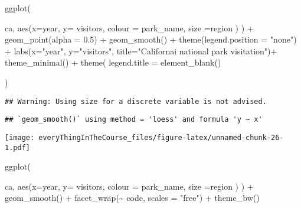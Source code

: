 \documentclass[
]{article}
\newenvironment{Shaded}{\begin{snugshade}}{\end{snugshade}}
\newcommand{\AttributeTok}[1]{\textcolor[rgb]{0.77,0.63,0.00}{#1}}
\newcommand{\FloatTok}[1]{\textcolor[rgb]{0.00,0.00,0.81}{#1}}
\newcommand{\FunctionTok}[1]{\textcolor[rgb]{0.00,0.00,0.00}{#1}}
\newcommand{\NormalTok}[1]{#1}
\newcommand{\SpecialCharTok}[1]{\textcolor[rgb]{0.00,0.00,0.00}{#1}}
\newcommand{\StringTok}[1]{\textcolor[rgb]{0.31,0.60,0.02}{#1}}
\begin{document}
\begin{Shaded}
\begin{Highlighting}[]
\FunctionTok{ggplot}\NormalTok{(}
  
\NormalTok{  ca, }\FunctionTok{aes}\NormalTok{(}\AttributeTok{x=}\NormalTok{year, }\AttributeTok{y=}\NormalTok{ visitors, }\AttributeTok{colour =}\NormalTok{ park\_name, }\AttributeTok{size =}\NormalTok{region )}
\NormalTok{) }\SpecialCharTok{+}
  \FunctionTok{geom\_point}\NormalTok{(}\AttributeTok{alpha =} \FloatTok{0.5}\NormalTok{) }\SpecialCharTok{+}
  \FunctionTok{geom\_smooth}\NormalTok{() }\SpecialCharTok{+}
  \FunctionTok{theme}\NormalTok{(}\AttributeTok{legend.position =} \StringTok{"none"}\NormalTok{) }\SpecialCharTok{+}
  \FunctionTok{labs}\NormalTok{(}\AttributeTok{x=}\StringTok{"year"}\NormalTok{, }\AttributeTok{y=}\StringTok{"visitors"}\NormalTok{, }\AttributeTok{title=}\StringTok{"Californai national park visitation"}\NormalTok{)}\SpecialCharTok{+}
  \FunctionTok{theme\_minimal}\NormalTok{() }\SpecialCharTok{+}
  \FunctionTok{theme}\NormalTok{(}
    \AttributeTok{legend.title =} \FunctionTok{element\_blank}\NormalTok{()}
    
\NormalTok{  )}
\end{Highlighting}
\end{Shaded}

\begin{verbatim}
## Warning: Using size for a discrete variable is not advised.
\end{verbatim}

\begin{verbatim}
## `geom_smooth()` using method = 'loess' and formula 'y ~ x'
\end{verbatim}

\texttt{[image: everyThingInTheCourse\_files/figure-latex/unnamed-chunk-26-1.pdf]}

\begin{Shaded}
\begin{Highlighting}[]
\FunctionTok{ggplot}\NormalTok{(}
  
\NormalTok{  ca, }\FunctionTok{aes}\NormalTok{(}\AttributeTok{x=}\NormalTok{year, }\AttributeTok{y=}\NormalTok{ visitors, }\AttributeTok{colour =}\NormalTok{ park\_name, }\AttributeTok{size =}\NormalTok{region )}
\NormalTok{) }\SpecialCharTok{+}
  \FunctionTok{geom\_smooth}\NormalTok{() }\SpecialCharTok{+}
  \FunctionTok{facet\_wrap}\NormalTok{(}\SpecialCharTok{\textasciitilde{}}\NormalTok{ code, }\AttributeTok{scales =} \StringTok{"free"}\NormalTok{) }\SpecialCharTok{+} 
  \FunctionTok{theme\_bw}\NormalTok{()}
\end{Highlighting}
\end{Shaded}
\end{document}
